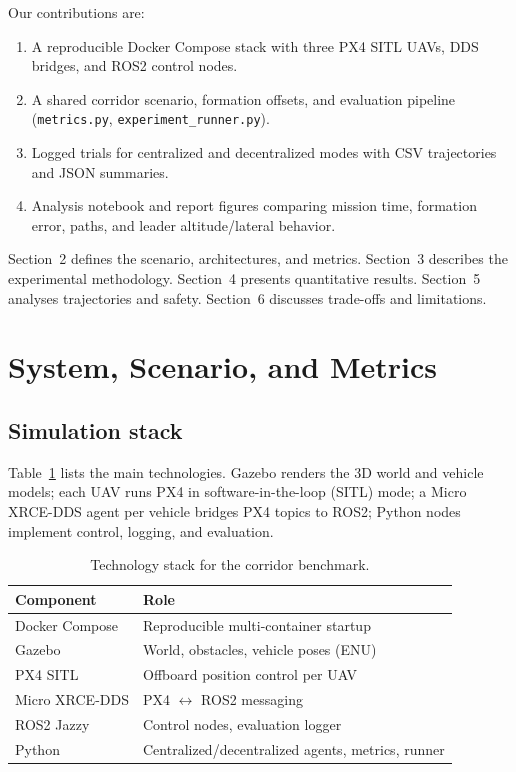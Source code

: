 \documentclass[a4paper,11pt]{article}
\begin{document}
Our contributions are:
\begin{enumerate}
  \item A reproducible Docker Compose stack with three PX4 SITL UAVs, DDS bridges, and ROS2 control nodes.
  \item A shared corridor scenario, formation offsets, and evaluation pipeline (\texttt{metrics.py}, \texttt{experiment\_runner.py}).
  \item Logged trials for centralized and decentralized modes with CSV trajectories and JSON summaries.
  \item Analysis notebook and report figures comparing mission time, formation error, paths, and leader altitude/lateral behavior.
\end{enumerate}

Section~2 defines the scenario, architectures, and metrics. Section~3 describes the experimental methodology. Section~4 presents quantitative results. Section~5 analyses trajectories and safety. Section~6 discusses trade-offs and limitations.

\section{System, Scenario, and Metrics}

\subsection{Simulation stack}

Table~\ref{tab:stack} lists the main technologies. Gazebo renders the 3D world and vehicle models; each UAV runs PX4 in software-in-the-loop (SITL) mode; a Micro XRCE-DDS agent per vehicle bridges PX4 topics to ROS2; Python nodes implement control, logging, and evaluation.

\begin{table}[H]
  \centering
  \small
  \begin{tabularx}{\textwidth}{lX}
    \toprule
    Component & Role \\
    \midrule
    Docker Compose & Reproducible multi-container startup \\
    Gazebo & World, obstacles, vehicle poses (ENU) \\
    PX4 SITL & Offboard position control per UAV \\
    Micro XRCE-DDS & PX4 $\leftrightarrow$ ROS2 messaging \\
    ROS2 Jazzy & Control nodes, evaluation logger \\
    Python & Centralized/decentralized agents, metrics, runner \\
    \bottomrule
  \end{tabularx}
  \caption{Technology stack for the corridor benchmark.}
  \label{tab:stack}
\end{table}
\end{document}
